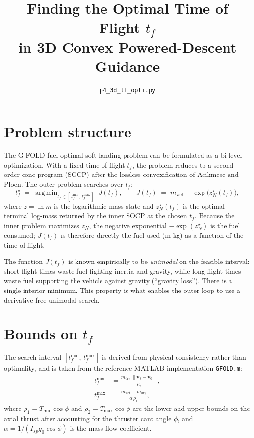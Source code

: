 \documentclass[11pt]{article}
\title{Finding the Optimal Time of Flight $t_f$ \\
       in 3D Convex Powered-Descent Guidance}
\author{\texttt{p4\_3d\_tf\_opti.py}}
\date{}
\DeclareMathOperator*{\argmin}{arg\,min}
\begin{document}
\maketitle

\section{Problem structure}

The G-FOLD fuel-optimal soft landing problem can be formulated as a bi-level
optimization. With a fixed time of flight $t_f$, the problem reduces to a
second-order cone program (SOCP) after the lossless convexification of
Acikmese and Ploen. The outer problem searches over $t_f$:
%
\begin{equation}
  t_f^\star \;=\; \argmin_{t_f \in [\,t_f^{\min},\,t_f^{\max}\,]} \; J(t_f),
  \qquad
  J(t_f) \;=\; m_{\text{wet}} - \exp\!\bigl(z_N^\star(t_f)\bigr),
  \label{eq:outer}
\end{equation}
%
where $z = \ln m$ is the logarithmic mass state and $z_N^\star(t_f)$ is the
optimal terminal log-mass returned by the inner SOCP at the chosen $t_f$.
Because the inner problem maximizes $z_N$, the negative exponential
$-\exp(z_N^\star)$ is the fuel consumed; $J(t_f)$ is therefore directly the
fuel used (in kg) as a function of the time of flight.

The function $J(t_f)$ is known empirically to be \emph{unimodal} on the feasible
interval: short flight times waste fuel fighting inertia and gravity, while
long flight times waste fuel supporting the vehicle against gravity
(``gravity loss''). There is a single interior minimum. This property is what
enables the outer loop to use a derivative-free unimodal search.

\section{Bounds on $t_f$}

The search interval $[t_f^{\min},\,t_f^{\max}]$ is derived from physical
consistency rather than optimality, and is taken from the reference MATLAB
implementation \texttt{GFOLD.m}:
%
\begin{align}
  t_f^{\min} &= \frac{m_{\text{dry}} \,\lVert \bm{v}_f - \bm{v}_0 \rVert}{\rho_2},
  \label{eq:tfmin}\\[2pt]
  t_f^{\max} &= \frac{m_{\text{wet}} - m_{\text{dry}}}{\alpha\,\rho_1},
  \label{eq:tfmax}
\end{align}
%
where $\rho_1 = T_{\min}\cos\phi$ and $\rho_2 = T_{\max}\cos\phi$ are the lower
and upper bounds on the axial thrust after accounting for the thruster cant
angle $\phi$, and $\alpha = 1/(I_{sp} g_0 \cos\phi)$ is the mass-flow
coefficient.
\end{document}
